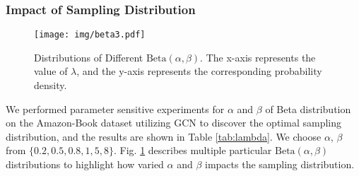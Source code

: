 \subsubsection{\textbf{Impact of Sampling Distribution}}



\begin{figure}[t]
    \centering
    \texttt{[image: img/beta3.pdf]}
    \caption{Distributions of Different $\text{Beta}(\alpha,\beta)$. The x-axis represents the value of $\lambda$, and the y-axis represents the corresponding probability density.}
    \label{fig:beta}
\end{figure}

We performed parameter sensitive experiments for \(\alpha\) and \(\beta\) of Beta distribution on the Amazon-Book dataset utilizing GCN to discover the optimal sampling distribution, and the results are shown in Table \ref{tab:lambda}. 
We choose $\alpha$, $\beta$ from $\{0.2,0.5, 0.8, 1, 5, 8\}$. Fig. \ref{fig:beta} describes multiple particular $\text{Beta}(\alpha,\beta)$ distributions to highlight how varied $\alpha$ and $\beta$ impacts the sampling distribution.


\begin{table}[t]
\centering
\renewcommand\arraystretch{2} 
\caption{ Impact of Beta Distribution}
\label{tab:lambda}
\end{table}



